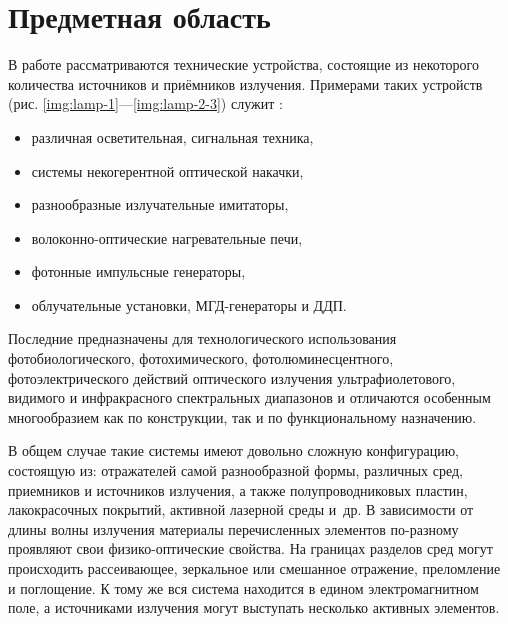 \section{Предметная область}

В работе рассматриваются технические устройства, состоящие из некоторого количества источников и приёмников излучения.
Примерами таких устройств (рис. \ref{img:lamp-1}—\ref{img:lamp-2-3}) служит \cite{lighting-engineering, lasers, neodymium-glass-lasers, sarychev}:
\begin{itemize}
	\item различная осветительная, сигнальная техника,
	\item системы некогерентной оптической накачки,
	\item разнообразные излучательные имитаторы,
	\item волоконно-оптические нагревательные печи,
	\item фотонные импульсные генераторы,
	\item облучательные установки, МГД-генераторы и ДДП.
\end{itemize}



Последние предназначены для технологического использования фотобиологического, фотохимического, фотолюминесцентного, фотоэлектрического действий оптического излучения ультрафиолетового, видимого и инфракрасного спектральных диапазонов и отличаются особенным многообразием как по конструкции, так и по функциональному назначению.

В общем случае такие системы имеют довольно сложную конфигурацию, состоящую из:
отражателей самой разнообразной формы, различных сред, приемников и источников излучения, а также полупроводниковых пластин, лакокрасочных покрытий, активной лазерной среды и~др.
В зависимости от длины волны излучения материалы перечисленных элементов по-разному проявляют свои физико-оптические свойства.
На границах разделов сред могут происходить рассеивающее, зеркальное или смешанное отражение, преломление и поглощение.
К тому же вся система находится в едином электромагнитном поле, а источниками излучения могут выступать несколько активных элементов.

